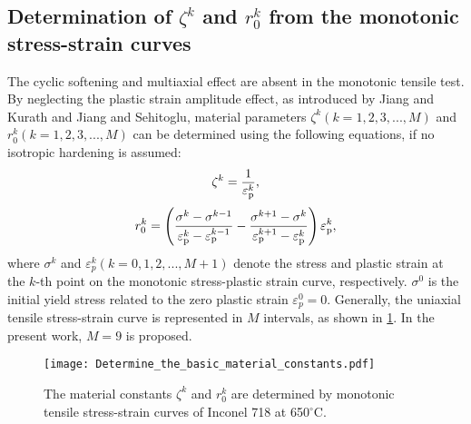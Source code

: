 \subsection{Determination of $\zeta^k$ and $r_0^k$ from the monotonic stress-strain curves}
\noindent
The cyclic softening and multiaxial effect are absent in the monotonic tensile test.
By neglecting the plastic strain amplitude effect, as introduced by Jiang and Kurath\cite{Jiang1996387} and Jiang and Sehitoglu\cite{jiang1996modeling}, material parameters ${\zeta ^k}( k = 1,2,3,...,M )$ and $r_0^k( k = 1,2,3,...,M )$ can be determined using the following equations, if no isotropic hardening is assumed:
\begin{equation}
{\zeta ^k} = \frac{1}{{\varepsilon _{\rm{p}}^k}},
\label{Eqn:zetak}
\end{equation}
\begin{equation}
r_0^k = \left( {\frac{{\sigma _{}^k - \sigma _{}^{k - 1}}}{{\varepsilon _{\rm{p}}^k - \varepsilon _{\rm{p}}^{k - 1}}} - \frac{{\sigma _{}^{k + 1} - \sigma _{}^k}}{{\varepsilon _{\rm{p}}^{k + 1} - \varepsilon _{\rm{p}}^k}}} \right)\varepsilon _{\rm{p}}^k,
\end{equation}
where $\sigma^k$ and $\varepsilon_p^k( k = 0,1,2,...,M+1 )$ denote the stress and plastic strain at the $k$-th point on the monotonic  stress-plastic strain curve, respectively. $\sigma^0$ is the initial yield stress related to the zero plastic strain $\varepsilon_p^0=0$. Generally, the uniaxial tensile stress-strain curve is represented in $M$ intervals, as shown in \ref{Fig:Determine_the_basic_material_constants}. In the present work, $M=9$ is proposed.

\begin{figure}[!htp]
  \centering
  \texttt{[image: Determine\_the\_basic\_material\_constants.pdf]}
  \caption{The material constants $\zeta^k$ and $r_0^k$ are determined by monotonic tensile stress-strain curves of Inconel 718 at 650$^\circ$C.}
  \label{Fig:Determine_the_basic_material_constants}
\end{figure}


